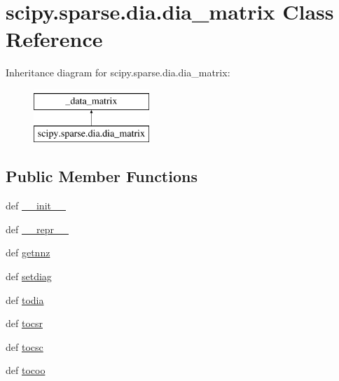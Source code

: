 \hypertarget{classscipy_1_1sparse_1_1dia_1_1dia__matrix}{}\section{scipy.\+sparse.\+dia.\+dia\+\_\+matrix Class Reference}
\label{classscipy_1_1sparse_1_1dia_1_1dia__matrix}
Inheritance diagram for scipy.\+sparse.\+dia.\+dia\+\_\+matrix\+:\begin{figure}[H]
\begin{center}
\leavevmode
\includegraphics[height=2.000000cm]{classscipy_1_1sparse_1_1dia_1_1dia__matrix}
\end{center}
\end{figure}
\subsection*{Public Member Functions}
\begin{DoxyCompactItemize}
\item 
def \hyperlink{classscipy_1_1sparse_1_1dia_1_1dia__matrix_a2fe326fc8bd85401679265eb23e75c6a}{\+\_\+\+\_\+init\+\_\+\+\_\+}
\item 
def \hyperlink{classscipy_1_1sparse_1_1dia_1_1dia__matrix_a2ad65edbb8045cc7badcb4fba2d1d62d}{\+\_\+\+\_\+repr\+\_\+\+\_\+}
\item 
def \hyperlink{classscipy_1_1sparse_1_1dia_1_1dia__matrix_ac9cba8a915448a44a34e5b799063fae2}{getnnz}
\item 
def \hyperlink{classscipy_1_1sparse_1_1dia_1_1dia__matrix_abeb06bcaf4e6c46ca052c8fde5e37eba}{setdiag}
\item 
def \hyperlink{classscipy_1_1sparse_1_1dia_1_1dia__matrix_af98283eb18ef2a2ec07f10ca6aa03a93}{todia}
\item 
def \hyperlink{classscipy_1_1sparse_1_1dia_1_1dia__matrix_a60335b71c7529b208bac8dd8f4ff710c}{tocsr}
\item 
def \hyperlink{classscipy_1_1sparse_1_1dia_1_1dia__matrix_acabc88080deb49bfdf3d62bfb06ff51d}{tocsc}
\item 
def \hyperlink{classscipy_1_1sparse_1_1dia_1_1dia__matrix_a02f72da9d7fa9466b89316a6ce8ea63c}{tocoo}
\end{DoxyCompactItemize}
